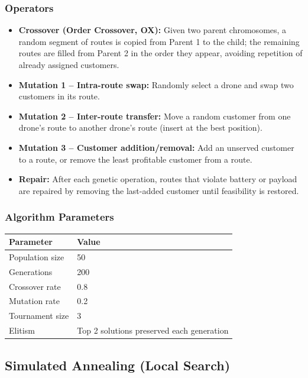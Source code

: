 \documentclass[12pt,a4paper]{article}
\begin{document}
\subsubsection{Operators}

\begin{itemize}
  \item \textbf{Crossover (Order Crossover, OX):} Given two parent chromosomes, a
  random segment of routes is copied from Parent 1 to the child; the remaining routes
  are filled from Parent 2 in the order they appear, avoiding repetition of already
  assigned customers.
  \item \textbf{Mutation 1 -- Intra-route swap:} Randomly select a drone and swap
  two customers in its route.
  \item \textbf{Mutation 2 -- Inter-route transfer:} Move a random customer from one
  drone's route to another drone's route (insert at the best position).
  \item \textbf{Mutation 3 -- Customer addition/removal:} Add an unserved customer to
  a route, or remove the least profitable customer from a route.
  \item \textbf{Repair:} After each genetic operation, routes that violate battery or
  payload are repaired by removing the last-added customer until feasibility is restored.
\end{itemize}

\subsubsection{Algorithm Parameters}

\begin{center}
\begin{tabular}{ll}
\toprule
Parameter & Value \\
\midrule
Population size & 50 \\
Generations & 200 \\
Crossover rate & 0.8 \\
Mutation rate & 0.2 \\
Tournament size & 3 \\
Elitism & Top 2 solutions preserved each generation \\
\bottomrule
\end{tabular}
\end{center}

\subsection{Simulated Annealing (Local Search)}
\end{document}

